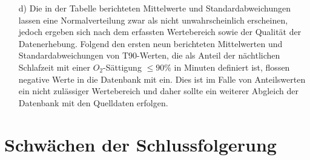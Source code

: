 \documentclass[toc=sectionentrywithdots]{scrartcl}
\theoremstyle{definition}
\theoremstyle{remark}
\begin{document}
\begin{enumerate}
	\item[d) ]Die in der Tabelle berichteten Mittelwerte und Standardabweichungen lassen eine Normalverteilung zwar als nicht unwahrscheinlich erscheinen, jedoch ergeben sich nach dem erfassten Wertebereich sowie der Qualität der Datenerhebung. Folgend den ersten neun berichteten Mittelwerten und Standardabweichungen von T90-Werten, die als Anteil der nächtlichen Schlafzeit mit einer $O_2$-Sättigung $\le 90\%$ in Minuten definiert ist, flossen negative Werte in die Datenbank mit ein. Dies ist im Falle von Anteilswerten ein nicht zulässiger Wertebereich und daher sollte ein weiterer Abgleich der Datenbank mit den Quelldaten erfolgen.    
\end{enumerate}


\section{Schwächen der Schlussfolgerung}





%

%
%

\end{document}
